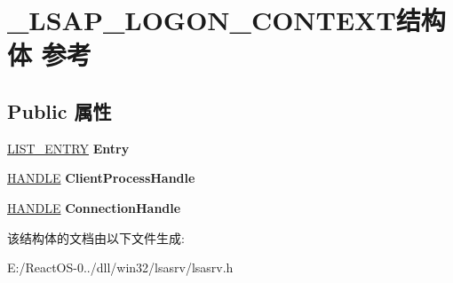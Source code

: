 \hypertarget{struct___l_s_a_p___l_o_g_o_n___c_o_n_t_e_x_t}{}\section{\+\_\+\+L\+S\+A\+P\+\_\+\+L\+O\+G\+O\+N\+\_\+\+C\+O\+N\+T\+E\+X\+T结构体 参考}
\label{struct___l_s_a_p___l_o_g_o_n___c_o_n_t_e_x_t}
\subsection*{Public 属性}
\begin{DoxyCompactItemize}
\item 
\mbox{\label{struct___l_s_a_p___l_o_g_o_n___c_o_n_t_e_x_t_a727c0709a4821bda376f5f34d0ba7840}} 
\hyperlink{struct___l_i_s_t___e_n_t_r_y}{L\+I\+S\+T\+\_\+\+E\+N\+T\+RY} {\bfseries Entry}
\item 
\mbox{\label{struct___l_s_a_p___l_o_g_o_n___c_o_n_t_e_x_t_ace6362ee34af521111515dc854b0341d}} 
\hyperlink{interfacevoid}{H\+A\+N\+D\+LE} {\bfseries Client\+Process\+Handle}
\item 
\mbox{\label{struct___l_s_a_p___l_o_g_o_n___c_o_n_t_e_x_t_ada68d75016b8adee68afcc2fe3196dc7}} 
\hyperlink{interfacevoid}{H\+A\+N\+D\+LE} {\bfseries Connection\+Handle}
\end{DoxyCompactItemize}


该结构体的文档由以下文件生成\+:\begin{DoxyCompactItemize}
\item 
E\+:/\+React\+O\+S-\/0../dll/win32/lsasrv/lsasrv.\+h\end{DoxyCompactItemize}
